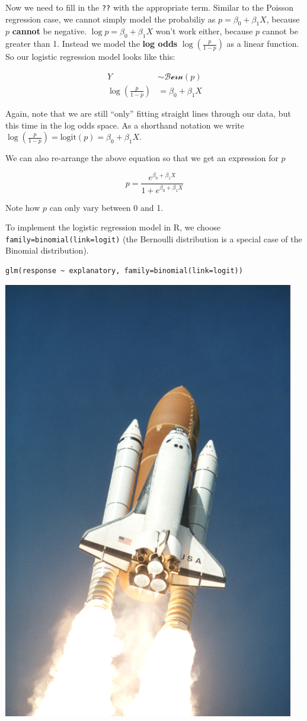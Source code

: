 \documentclass[
]{book}
\begin{document}
Now we need to fill in the \texttt{??} with the appropriate term. Similar to the Poisson regression case,
we cannot simply model the probabiliy as \(p = \beta_0 + \beta_1X\), because \(p\) \textbf{cannot} be negative.
\(\log{p} = \beta_0 + \beta_1X\) won't work either, because \(p\) cannot be greater than 1. Instead we
model the \textbf{log odds} \(\log\left(\frac{p}{1 - p}\right)\) as a linear function. So our logistic regression model looks
like this:

\[
\begin{aligned}
Y  & \sim \mathcal{Bern}(p)\\
\log\left(\frac{p}{1 - p}\right) &  = \beta_0 + \beta_1 X
\end{aligned}
\]

Again, note that we are still ``only'' fitting straight lines through our data, but this time in the log odds space.
As a shorthand notation we write \(\log\left(\frac{p}{1 - p}\right) = \text{logit}(p) = \beta_0 + \beta_1 X\).

We can also re-arrange the above equation so that we get an expression for \(p\)

\[
p = \frac{e^{\beta_0 + \beta_1 X}}{1 + e^{\beta_0 + \beta_1 X}}
\]

Note how \(p\) can only vary between 0 and 1.

To implement the logistic regression model in R, we choose \texttt{family=binomial(link=logit)} (the Bernoulli distribution is a special case of the Binomial distribution).

\begin{verbatim}
glm(response ~ explanatory, family=binomial(link=logit))
\end{verbatim}

\includegraphics[width=0.8\linewidth]{images/space-shuttle}
\end{document}
